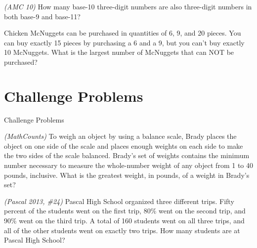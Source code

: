 \documentclass[9pt]{beamer}
\begin{document}
    \begin{frame}[t]{8.9}
    \begin{block}{}
        \textit{(AMC 10)} How many base-10 three-digit numbers are also three-digit numbers in both base-9 and base-11?
        
    \end{block}
    \end{frame}
    
    \begin{frame}[t]{8.10}
    \begin{block}{}
        Chicken McNuggets can be purchased in quantities of 6, 9, and 20 pieces. You can buy exactly 15 pieces by purchasing a 6 and a 9, but you can’t buy exactly 10 McNuggets. What is the largest number of McNuggets that can NOT be purchased?
        
    \end{block}
    \end{frame}
    
\newpage
\section{Challenge Problems}
\begin{frame}
    \begin{alertblock}{}
        \begin{flushright}
        {\huge Challenge Problems}
        \end{flushright}
    \end{alertblock}
\end{frame}

\begin{frame}[t]{9.1}
\begin{block}{}
   \textit{(MathCounts)}  To weigh an object by using a balance scale, Brady places the object on one side of the scale and places enough weights on each side to make the two sides of the scale balanced. Brady’s set of weights contains the minimum number necessary to measure the whole-number weight of any object from 1 to 40 pounds, inclusive. What is the greatest weight, in pounds, of a weight in Brady’s set?
	
\end{block}
\end{frame}

\begin{frame}[t]{9.2}
\begin{block}{}
   \textit{(Pascal 2013, \#24)}  Pascal High School organized three different trips. Fifty percent of the students went on the first trip, 80\% went on the second trip, and 90\% went on the third trip. A total of 160 students went on all three trips, and all of the other students went on exactly two trips. How many students are at Pascal High School?

	
\end{block}
\end{frame}
\end{document}
